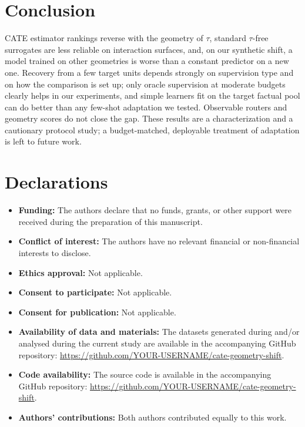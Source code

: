 \documentclass[pdflatex,sn-mathphys-num]{sn-jnl}
\begin{document}
\section{Conclusion}
CATE estimator rankings reverse with the geometry of $\tau$, standard $\tau$-free surrogates are less reliable on interaction surfaces, and, on our synthetic shift, a model trained on other geometries is worse than a constant predictor on a new one. Recovery from a few target units depends strongly on supervision type and on how the comparison is set up; only oracle supervision at moderate budgets clearly helps in our experiments, and simple learners fit on the target factual pool can do better than any few-shot adaptation we tested. Observable routers and geometry scores do not close the gap. These results are a characterization and a cautionary protocol study; a budget-matched, deployable treatment of adaptation is left to future work.

\backmatter

\section*{Declarations}
\begin{itemize}
\item \textbf{Funding:} The authors declare that no funds, grants, or other support were received during the preparation of this manuscript.
\item \textbf{Conflict of interest:} The authors have no relevant financial or non-financial interests to disclose.
\item \textbf{Ethics approval:} Not applicable.
\item \textbf{Consent to participate:} Not applicable.
\item \textbf{Consent for publication:} Not applicable.
\item \textbf{Availability of data and materials:} The datasets generated during and/or analysed during the current study are available in the accompanying GitHub repository: \url{https://github.com/YOUR-USERNAME/cate-geometry-shift}.
\item \textbf{Code availability:} The source code is available in the accompanying GitHub repository: \url{https://github.com/YOUR-USERNAME/cate-geometry-shift}.
\item \textbf{Authors' contributions:} Both authors contributed equally to this work.
\end{itemize}
\end{document}
